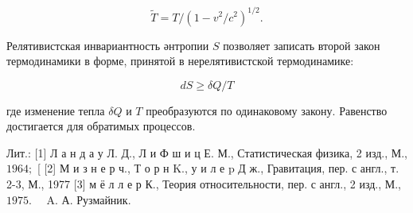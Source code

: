 \documentclass[10pt]{article}
\begin{document}
\[

\tilde{T}=T /\left(1-v^{2} / c^{2}\right)^{1 / 2} .

\]



Релятивистская инвариантность әнтропии $S$ позволяет записать второй закон термодинамики в форме, принятой в нерелятивистской термодинамике:



\[

d S \geqslant \delta Q / T

\]



где изменение тепла $\delta Q$ и $T$ преобразуются по одинаковому закону. Равенство достигается для обратимых процессов.



Лит.: [1] Л а н д а у Л. Д., Л и Ф ш и ц Е. М., Статистическая физика, 2 изд., М., $1964 ;$ [ [2] М и з н е р ч., Т о р н K., у и л е $\mathrm{p}$ Д ж., Гравитация, пер. с англ., т. 2-3, М., 1977 [3] м ё л л е р К., Теория относительности, пер. с англ., 2 изд., М., $1975 . \quad$ A. А. Рузмайник.
\end{document}
